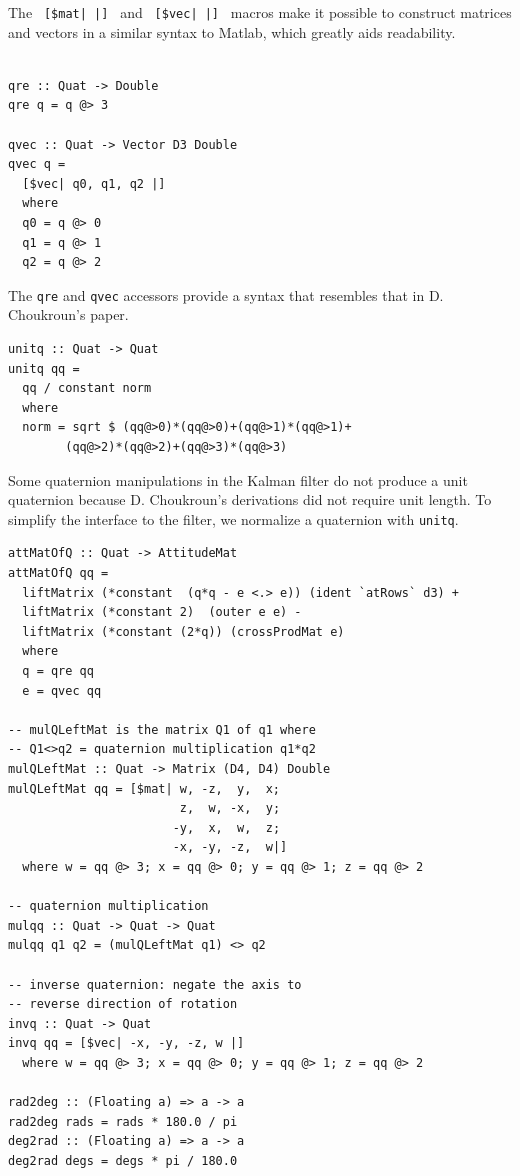 \documentclass[12pt]{report}
\begin{document}
The \lstinline& [$mat| |] & and \lstinline& [$vec| |] & macros make it possible to construct matrices and vectors in a similar syntax to Matlab, which greatly aids readability.

\begin{lstlisting}

qre :: Quat -> Double
qre q = q @> 3

qvec :: Quat -> Vector D3 Double
qvec q = 
  [$vec| q0, q1, q2 |]
  where 
  q0 = q @> 0
  q1 = q @> 1
  q2 = q @> 2

\end{lstlisting}
The \lstinline$qre$ and \lstinline$qvec$ accessors provide a syntax that resembles that in D. Choukroun's paper.
\begin{lstlisting}
unitq :: Quat -> Quat 
unitq qq = 
  qq / constant norm 
  where 
  norm = sqrt $ (qq@>0)*(qq@>0)+(qq@>1)*(qq@>1)+
		(qq@>2)*(qq@>2)+(qq@>3)*(qq@>3)

\end{lstlisting}

Some quaternion manipulations in the Kalman filter do not produce a unit quaternion because D. Choukroun's derivations did not require unit length. To simplify the interface to the filter, we normalize a quaternion with \lstinline$unitq$.

\begin{lstlisting}
attMatOfQ :: Quat -> AttitudeMat
attMatOfQ qq = 
  liftMatrix (*constant  (q*q - e <.> e)) (ident `atRows` d3) + 
  liftMatrix (*constant 2)  (outer e e) -
  liftMatrix (*constant (2*q)) (crossProdMat e)
  where 
  q = qre qq 
  e = qvec qq

-- mulQLeftMat is the matrix Q1 of q1 where 
-- Q1<>q2 = quaternion multiplication q1*q2
mulQLeftMat :: Quat -> Matrix (D4, D4) Double
mulQLeftMat qq = [$mat| w, -z,  y,  x;
                        z,  w, -x,  y;
                       -y,  x,  w,  z;
                       -x, -y, -z,  w|]
  where w = qq @> 3; x = qq @> 0; y = qq @> 1; z = qq @> 2

-- quaternion multiplication
mulqq :: Quat -> Quat -> Quat
mulqq q1 q2 = (mulQLeftMat q1) <> q2

-- inverse quaternion: negate the axis to 
-- reverse direction of rotation
invq :: Quat -> Quat
invq qq = [$vec| -x, -y, -z, w |]
  where w = qq @> 3; x = qq @> 0; y = qq @> 1; z = qq @> 2

rad2deg :: (Floating a) => a -> a
rad2deg rads = rads * 180.0 / pi
deg2rad :: (Floating a) => a -> a
deg2rad degs = degs * pi / 180.0

\end{lstlisting}
\end{document}
